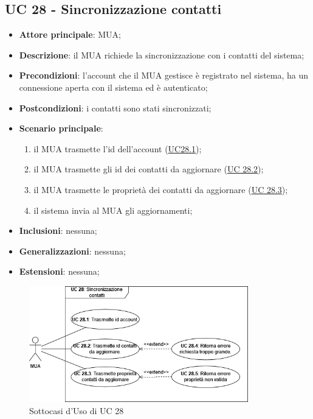 
\subsection{UC 28 - Sincronizzazione contatti} \label{sec:UC28}
    
    \begin{itemize}
        \item \textbf{Attore principale}: MUA;
        \item \textbf{Descrizione}: il MUA richiede la sincronizzazione con i contatti del sistema;
        \item \textbf{Precondizioni}: l’account che il MUA gestisce è registrato nel sistema, ha un connessione aperta con il sistema ed è autenticato;
        \item \textbf{Postcondizioni}: i contatti sono stati sincronizzati;
        \item \textbf{Scenario principale}:
            \begin{enumerate}
                \item il MUA trasmette l'id dell'account (\hyperref[sec:UC28.1]{UC28.1});
                \item il MUA trasmette gli id dei contatti da aggiornare (\hyperref[sec:UC28.2]{UC 28.2});
                \item il MUA trasmette le proprietà dei contatti da aggiornare (\hyperref[sec:UC28.3]{UC 28.3});
                \item il sistema invia al MUA gli aggiornamenti;
            \end{enumerate}
        \item \textbf{Inclusioni}: nessuna;
        \item \textbf{Generalizzazioni}: nessuna;
        \item \textbf{Estensioni}: nessuna;
    \end{itemize}

    \begin{figure}[H]
        \includegraphics[width=0.85\textwidth]{sections/uc_imgs/UC28.png}
        \centering
        \caption{Sottocasi d'Uso di UC 28}
    \end{figure}

